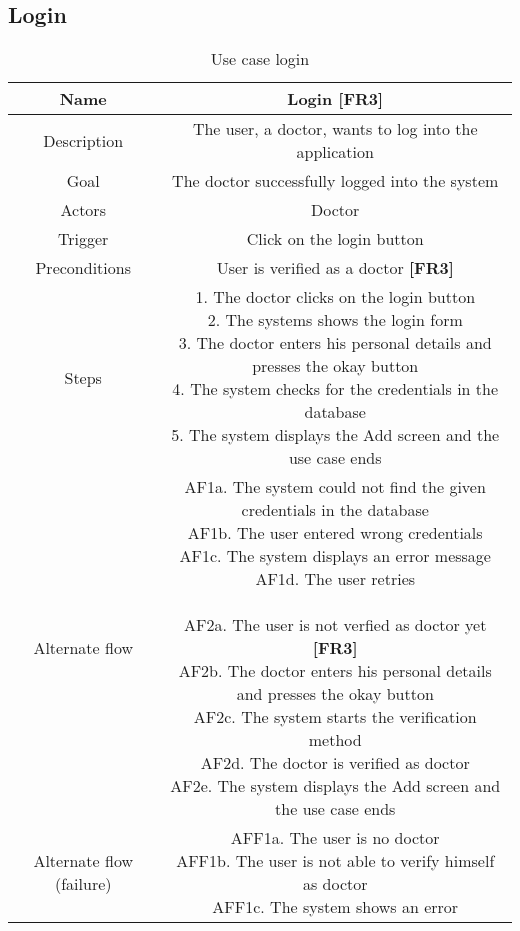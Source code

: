 \subsection{Login}
\begin{table}[H]
	\begin{center}\scriptsize
		\begin{tabular}{ |c|c| } 
			\hline	
			Name & Login \textbf{[FR3]}\\ 
			\hline	
			Description & The user, a doctor, wants to log into the application \\ 
			\hline
			Goal & The doctor successfully logged into the system \\ 
			\hline
			Actors & Doctor \\ 
			\hline
			Trigger & Click on the login button \\ 
			\hline
			Preconditions & User is verified as a doctor \textbf{[FR3]} \\ 
			\hline
			Steps & \parbox{9cm}{\vspace{.5\baselineskip}
				1. The doctor clicks on the login button\\
				2. The systems shows the login form\\
				3. The doctor enters his personal details and presses the okay button\\
				4. The system checks for the credentials in the database\\
				5. The system displays the Add screen and the use case ends\\}\\
			\hline
			Alternate flow & \parbox{9cm}{\vspace{.5\baselineskip}
				AF1a. The system could not find the given credentials in the database\\
				AF1b. The user entered wrong credentials\\
				AF1c. The system displays an error message\\
				AF1d. The user retries\\\\
				AF2a. The user is not verfied as doctor yet \textbf{[FR3]}\\
				AF2b. The doctor enters his personal details and presses the okay button\\
				AF2c. The system starts the verification method\\
				AF2d. The doctor is verified as doctor\\
				AF2e. The system displays the Add screen and the use case ends\\}\\ 
			\hline
			Alternate flow (failure) & \parbox{9cm}{\vspace{.5\baselineskip}
				AFF1a. The user is no doctor\\
				AFF1b. The user is not able to verify himself as doctor\\
				AFF1c. The system shows an error}\\
			\hline
		\end{tabular}
	\end{center}\normalsize
	\caption{Use case login}
\end{table}


